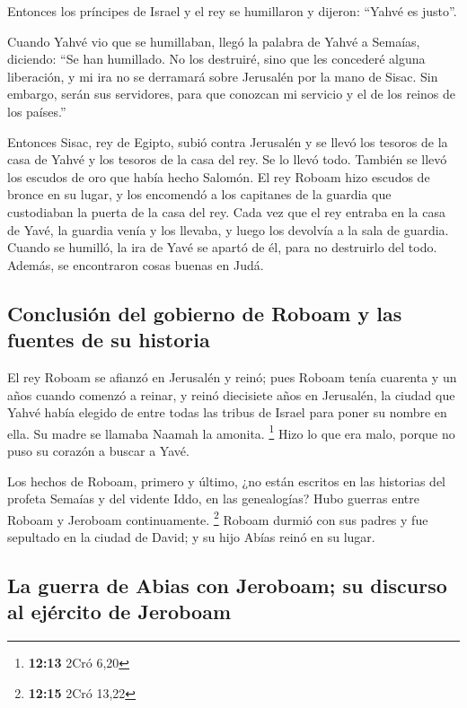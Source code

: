  Entonces los príncipes de Israel y el rey se humillaron y
dijeron: ``Yahvé es justo''.

 Cuando Yahvé vio que se humillaban, llegó la palabra de
Yahvé a Semaías, diciendo: ``Se han humillado. No los destruiré, sino
que les concederé alguna liberación, y mi ira no se derramará sobre
Jerusalén por la mano de Sisac.  Sin embargo, serán sus
servidores, para que conozcan mi servicio y el de los reinos de los
países.''

 Entonces Sisac, rey de Egipto, subió contra Jerusalén y
se llevó los tesoros de la casa de Yahvé y los tesoros de la casa del
rey. Se lo llevó todo. También se llevó los escudos de oro que había
hecho Salomón.  El rey Roboam hizo escudos de bronce en
su lugar, y los encomendó a los capitanes de la guardia que custodiaban
la puerta de la casa del rey.  Cada vez que el rey
entraba en la casa de Yavé, la guardia venía y los llevaba, y luego los
devolvía a la sala de guardia.  Cuando se humilló, la ira
de Yavé se apartó de él, para no destruirlo del todo. Además, se
encontraron cosas buenas en Judá.

\hypertarget{conclusiuxf3n-del-gobierno-de-roboam-y-las-fuentes-de-su-historia}{%
\subsection{Conclusión del gobierno de Roboam y las fuentes de su
historia}\label{conclusiuxf3n-del-gobierno-de-roboam-y-las-fuentes-de-su-historia}}

 El rey Roboam se afianzó en Jerusalén y reinó; pues
Roboam tenía cuarenta y un años cuando comenzó a reinar, y reinó
diecisiete años en Jerusalén, la ciudad que Yahvé había elegido de entre
todas las tribus de Israel para poner su nombre en ella. Su madre se
llamaba Naamah la amonita. \footnote{\textbf{12:13} 2Cró 6,20}
 Hizo lo que era malo, porque no puso su corazón a buscar
a Yavé.

 Los hechos de Roboam, primero y último, ¿no están
escritos en las historias del profeta Semaías y del vidente Iddo, en las
genealogías? Hubo guerras entre Roboam y Jeroboam continuamente.
\footnote{\textbf{12:15} 2Cró 13,22}  Roboam durmió con
sus padres y fue sepultado en la ciudad de David; y su hijo Abías reinó
en su lugar.

\hypertarget{la-guerra-de-abias-con-jeroboam-su-discurso-al-ejuxe9rcito-de-jeroboam}{%
\subsection{La guerra de Abias con Jeroboam; su discurso al ejército de
Jeroboam}\label{la-guerra-de-abias-con-jeroboam-su-discurso-al-ejuxe9rcito-de-jeroboam}}


